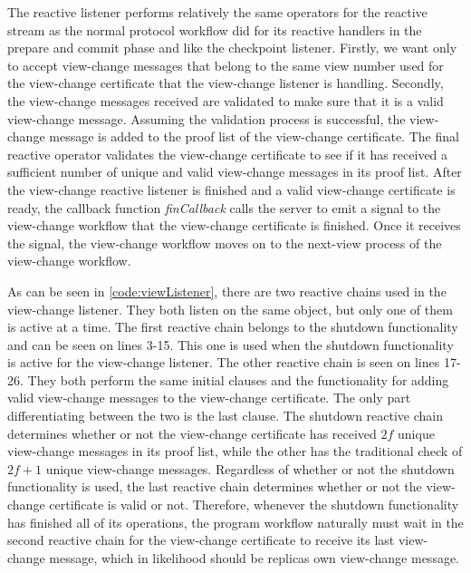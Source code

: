 The reactive listener performs relatively the same operators for the reactive stream as the normal protocol workflow did for its reactive handlers in the prepare and commit phase and like the checkpoint listener. Firstly, we want only to accept view-change messages that belong to the same view number used for the view-change certificate that the view-change listener is handling. Secondly, the view-change messages received are validated to make sure that it is a valid view-change message. Assuming the validation process is successful, the view-change message is added to the proof list of the view-change certificate. The final reactive operator validates the view-change certificate to see if it has received a sufficient number of unique and valid view-change messages in its proof list. After the view-change reactive listener is finished and a valid view-change certificate is ready, the callback function \emph{finCallback} calls the server to emit a signal to the view-change workflow that the view-change certificate is finished. Once it receives the signal, the view-change workflow moves on to the next-view process of the view-change workflow. 

As can be seen in \autoref{code:viewListener}, there are two reactive chains used in the view-change listener. They both listen on the same  object, but only one of them is active at a time. The first reactive chain belongs to the shutdown functionality and can be seen on lines 3-15. This one is used when the shutdown functionality is active for the view-change listener. The other reactive chain is seen on lines 17-26. They both perform the same initial  clauses and the functionality for adding valid view-change messages to the view-change certificate. The only part differentiating between the two is the last  clause. The shutdown reactive chain determines whether or not the view-change certificate has received $2f$ unique view-change messages in its proof list, while the other has the traditional check of $2f+1$ unique view-change messages. Regardless of whether or not the shutdown functionality is used, the last reactive chain determines whether or not the view-change certificate is valid or not. Therefore, whenever the shutdown functionality has finished all of its operations, the program workflow naturally must wait in the second reactive chain for the view-change certificate to receive its last view-change message, which in likelihood should be replicas own view-change message.

